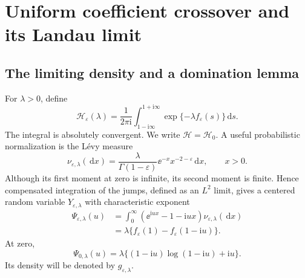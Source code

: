 \documentclass[11pt,a4paper]{article}
\numberwithin{equation}{section}
\theoremstyle{definition}
\theoremstyle{remark}
\newcommand{\dd}{\,\mathrm d}\newcommand{\ii}{\mathrm i}
\newcommand{\ep}{\varepsilon}\newcommand{\la}{\lambda}
\newcommand{\HH}{\mathcal H}\newcommand{\RR}{\mathcal R}
\begin{document}
\section{Uniform coefficient crossover and its Landau limit}
\label{sec:crossover}

\subsection{The limiting density and a domination lemma}
For \(\la>0\), define
\begin{equation}\label{eq:H}
 \HH_\ep(\la)=\frac1{2\pi\ii}
   \int_{1-\ii\infty}^{1+\ii\infty}\exp\{-\la f_\ep(s)\}\dd s.
\end{equation}
The integral is absolutely convergent. We write \(\HH=\HH_0\).
A useful probabilistic normalization is the L\'evy measure
\begin{equation}\label{eq:nu-eps}
 \nu_{\ep,\la}(\dd x)=
 \frac\la{\Gamma(1-\ep)}\ee^{-x}x^{-2-\ep}\dd x,
 \qquad x>0.
\end{equation}
Although its first moment at zero is infinite, its second moment is
finite. Hence compensated integration of the jumps, defined as an
\(L^2\) limit, gives a centered random variable \(Y_{\ep,\la}\) with
characteristic exponent
\begin{align}
 \Psi_{\ep,\la}(u)
 &=\int_0^\infty(\ee^{\ii ux}-1-\ii ux)\nu_{\ep,\la}(\dd x)\label{eq:psi-int}\\
 &=\la\{f_\ep(1)-f_\ep(1-\ii u)\}.\label{eq:psi}
\end{align}
At zero,
\begin{equation}\label{eq:psi-zero}
 \Psi_{0,\la}(u)=\la\{(1-\ii u)\log(1-\ii u)+\ii u\}.
\end{equation}
Its density will be denoted by \(g_{\ep,\la}\).
\end{document}
